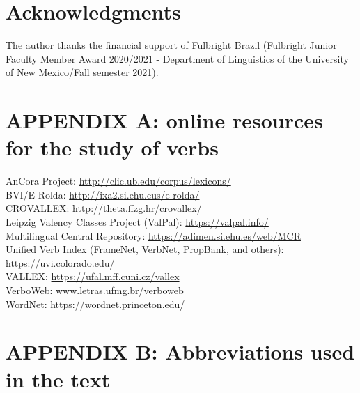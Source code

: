 \documentclass[english]{textolivre}
\begin{document}
\section{Acknowledgments}

The author thanks the financial support of Fulbright Brazil (Fulbright Junior Faculty Member Award 2020/2021 - Department of Linguistics of the University of New Mexico/Fall semester 2021).


\printbibliography\label{sec-bib}


\appendix 
\section{APPENDIX A: online resources for the study of verbs}\label{appendixA}

AnCora Project: \url{http://clic.ub.edu/corpus/lexicons/} \\
BVI/E-Rolda: \url{http://ixa2.si.ehu.eus/e-rolda/} \\
CROVALLEX: \url{http://theta.ffzg.hr/crovallex/} \\
Leipzig Valency Classes Project (ValPal): \url{https://valpal.info/} \\
Multilingual Central Repository: \url{https://adimen.si.ehu.es/web/MCR} \\
Unified Verb Index (FrameNet, VerbNet, PropBank, and others): \url{https://uvi.colorado.edu/} \\
VALLEX: \url{https://ufal.mff.cuni.cz/vallex} \\
VerboWeb: \url{www.letras.ufmg.br/verboweb} \\
WordNet: \url{https://wordnet.princeton.edu/} 

\section{APPENDIX B: Abbreviations used in the text}\label{appendixB}
\end{document}
